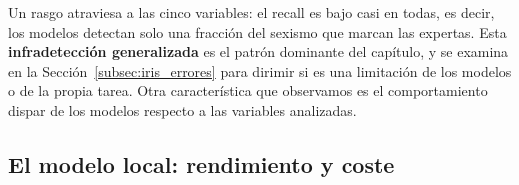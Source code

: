 \begin{table}[H]
    \centering
    \begingroup
    \scriptsize
    \renewcommand{\texttt}[1]{{\ttfamily #1}}
    \endgroup
\end{table}

Un rasgo atraviesa a las cinco variables: el recall es bajo casi en todas, es decir,
los modelos detectan solo una fracción del sexismo que marcan las expertas. Esta
\textbf{infradetección generalizada} es el patrón dominante del capítulo, y se
examina en la Sección~\ref{subsec:iris_errores} para dirimir si es una
limitación de los modelos o de la propia tarea. Otra característica que observamos es el comportamiento dispar de los modelos respecto a las variables analizadas.



\subsection{El modelo local: rendimiento y coste}
\label{subsec:iris_local}\label{subsec:iris_coste}

